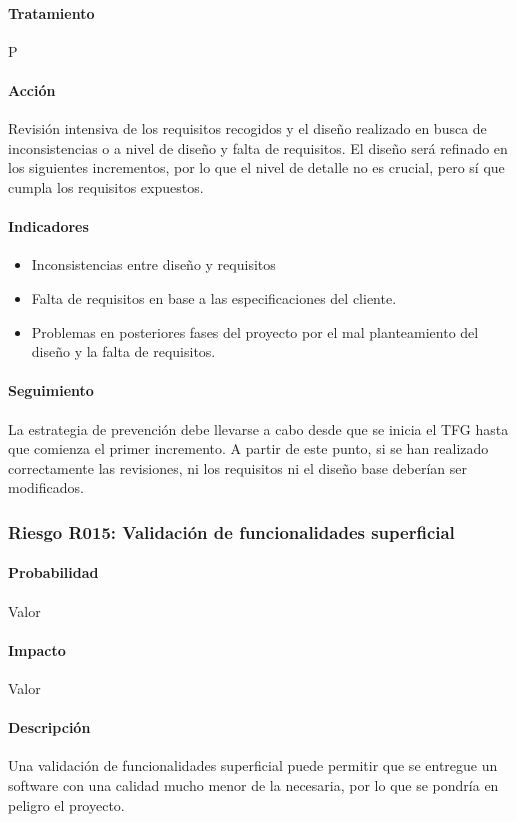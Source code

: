 \documentclass[10pt,a4paper]{article}
\begin{document}
				\paragraph{Tratamiento} P
				\paragraph{Acción} Revisión intensiva de los requisitos recogidos y el diseño realizado en busca de inconsistencias o a nivel de diseño y falta de requisitos. El diseño será refinado en los siguientes incrementos, por lo que el nivel de detalle no es crucial, pero sí que cumpla los requisitos expuestos.
				\paragraph{Indicadores} 
				    \begin{itemize}
				        \item Inconsistencias entre diseño y requisitos
				        \item Falta de requisitos en base a las especificaciones del cliente.
				        \item Problemas en posteriores fases del proyecto por el mal planteamiento del diseño y la falta de requisitos.
				    \end{itemize}
				\paragraph{Seguimiento}	La estrategia de prevención debe llevarse a cabo desde que se inicia el TFG hasta que comienza el primer incremento. A partir de este punto, si se han realizado correctamente las revisiones, ni los requisitos ni el diseño base deberían ser modificados. 
				\subsubsection{Riesgo R015: Validación de funcionalidades superficial}
				\paragraph{Probabilidad} Valor
				\paragraph{Impacto}	Valor
				\paragraph{Descripción} Una validación de funcionalidades superficial puede permitir que se entregue un software con una calidad mucho menor de la necesaria, por lo que se pondría en peligro el proyecto. 
\end{document}

